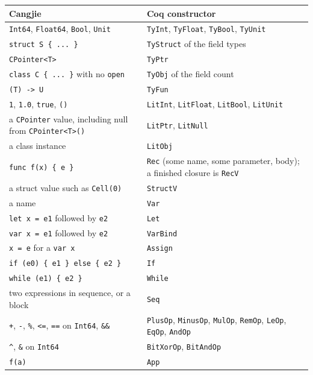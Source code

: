 \documentclass[11pt]{article}
\begin{document}
\begin{center}
\small
\begin{tabular}{@{}p{}p{}@{}}
\hline
Cangjie & Coq constructor \\
\hline
\texttt{Int64}, \texttt{Float64}, \texttt{Bool}, \texttt{Unit}
  & \texttt{TyInt}, \texttt{TyFloat}, \texttt{TyBool}, \texttt{TyUnit} \\
\texttt{struct S \{ ... \}}
  & \texttt{TyStruct} of the field types \\
\texttt{CPointer<T>}
  & \texttt{TyPtr} \\
\texttt{class C \{ ... \}} with no \texttt{open}
  & \texttt{TyObj} of the field count \\
\texttt{(T) -> U}
  & \texttt{TyFun} \\
\hline
\texttt{1}, \texttt{1.0}, \texttt{true}, \texttt{()}
  & \texttt{LitInt}, \texttt{LitFloat}, \texttt{LitBool}, \texttt{LitUnit} \\
a \texttt{CPointer} value, including null from \texttt{CPointer<T>()}
  & \texttt{LitPtr}, \texttt{LitNull} \\
a class instance
  & \texttt{LitObj} \\
\texttt{func f(x) \{ e \}}
  & \texttt{Rec} (some name, some parameter, body); a finished closure is \texttt{RecV} \\
a struct value such as \texttt{Cell(0)}
  & \texttt{StructV} \\
\hline
a name
  & \texttt{Var} \\
\texttt{let x = e1} followed by \texttt{e2}
  & \texttt{Let} \\
\texttt{var x = e1} followed by \texttt{e2}
  & \texttt{VarBind} \\
\texttt{x = e} for a \texttt{var x}
  & \texttt{Assign} \\
\texttt{if (e0) \{ e1 \} else \{ e2 \}}
  & \texttt{If} \\
\texttt{while (e1) \{ e2 \}}
  & \texttt{While} \\
two expressions in sequence, or a block
  & \texttt{Seq} \\
\texttt{+}, \texttt{-}, \texttt{\%}, \texttt{<=}, \texttt{==} on \texttt{Int64}, \texttt{\&\&}
  & \texttt{PlusOp}, \texttt{MinusOp}, \texttt{MulOp}, \texttt{RemOp}, \texttt{LeOp}, \texttt{EqOp}, \texttt{AndOp} \\
\texttt{\textasciicircum}, \texttt{\&} on \texttt{Int64}
  & \texttt{BitXorOp}, \texttt{BitAndOp} \\
\texttt{f(a)}
  & \texttt{App} \\

\end{tabular}
\end{center}
\end{document}
